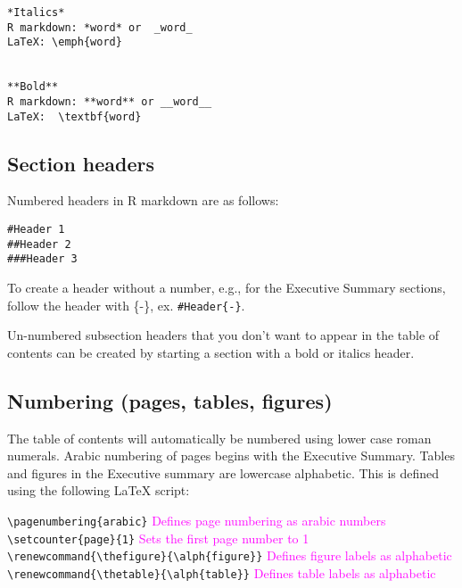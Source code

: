 \documentclass[12pt,]{article}
\begin{document}
\begin{Verbatim}[frame=single]
*Italics*  
R markdown: *word* or  _word_  
LaTeX: \emph{word}


**Bold**     
R markdown: **word** or __word__ 
LaTeX:  \textbf{word} 

\end{Verbatim}

\subsection{Section headers}\label{section-headers}

Numbered headers in R markdown are as follows:

\begin{Verbatim}[frame=single]
#Header 1  
##Header 2 
###Header 3
\end{Verbatim}

To create a header without a number, e.g., for the Executive Summary
sections, follow the header with \{-\}, ex. \texttt{\#Header\{-\}}.

Un-numbered subsection headers that you don't want to appear in the
table of contents can be created by starting a section with a bold or
italics header.

\subsection{Numbering (pages, tables,
figures)}\label{numbering-pages-tables-figures}

The table of contents will automatically be numbered using lower case
roman numerals. Arabic numbering of pages begins with the Executive
Summary. Tables and figures in the Executive summary are lowercase
alphabetic. This is defined using the following LaTeX script:

\texttt{\textbackslash{}pagenumbering\{arabic\}}
\textcolor{magenta}{Defines page numbering as arabic numbers}\\
\texttt{\textbackslash{}setcounter\{page\}\{1\}}
\textcolor{magenta}{Sets the first page number to 1}\\
\texttt{\textbackslash{}renewcommand\{\textbackslash{}thefigure\}\{\textbackslash{}alph\{figure\}\}}
\textcolor{magenta}{Defines figure labels as alphabetic}\\
\texttt{\textbackslash{}renewcommand\{\textbackslash{}thetable\}\{\textbackslash{}alph\{table\}\}}
\textcolor{magenta}{Defines table labels as alphabetic}

\vspace{.5cm}
\end{document}
